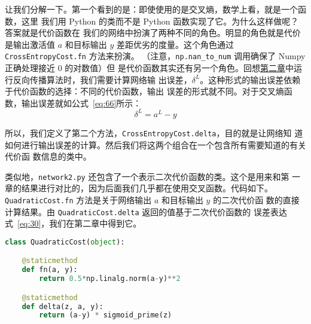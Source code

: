让我们分解一下。第一个看到的是：即使使用的是交叉熵，数学上看，就是一个函数，这里
我们用 Python 的类而不是 Python 函数实现了它。为什么这样做呢？答案就是代价函数在
我们的网络中扮演了两种不同的角色。明显的角色就是代价是输出激活值 $a$ 和目标输出
$y$ 差距优劣的度量。这个角色通过 \lstinline!CrossEntropyCost.fn! 方法来扮演。
（注意，\lstinline!np.nan_to_num! 调用确保了 Numpy 正确处理接近 $0$ 的对数值）但
是代价函数其实还有另一个角色。回想\hyperref[sec:the_four_fundamental_equations_behind_backpropagation]{第二章}中运行反向传播算法时，我们需要计算网络输
出误差，$\delta^L$。这种形式的输出误差依赖于代价函数的选择：不同的代价函数，输出
误差的形式就不同。对于交叉熵函数，输出误差就如公式~\eqref{eq:66}所示：
\begin{equation}
  \delta^L = a^L-y
  \label{eq:99}\tag{99}
\end{equation}

所以，我们定义了第二个方法，\lstinline!CrossEntropyCost.delta!，目的就是让网络知
道如何进行输出误差的计算。然后我们将这两个组合在一个包含所有需要知道的有关代价函
数信息的类中。

类似地，\lstinline!network2.py! 还包含了一个表示二次代价函数的类。这个是用来和第
一章的结果进行对比的，因为后面我们几乎都在使用交叉函数。代码如下。
\lstinline!QuadraticCost.fn! 方法是关于网络输出 $a$ 和目标输出 $y$ 的二次代价函
数的直接计算结果。由 \lstinline!QuadraticCost.delta! 返回的值基于二次代价函数的
误差表达式~\eqref{eq:30}，我们在第二章中得到它。
\begin{lstlisting}[language=Python]
class QuadraticCost(object):

    @staticmethod
    def fn(a, y):
        return 0.5*np.linalg.norm(a-y)**2

    @staticmethod
    def delta(z, a, y):
        return (a-y) * sigmoid_prime(z)
\end{lstlisting}

